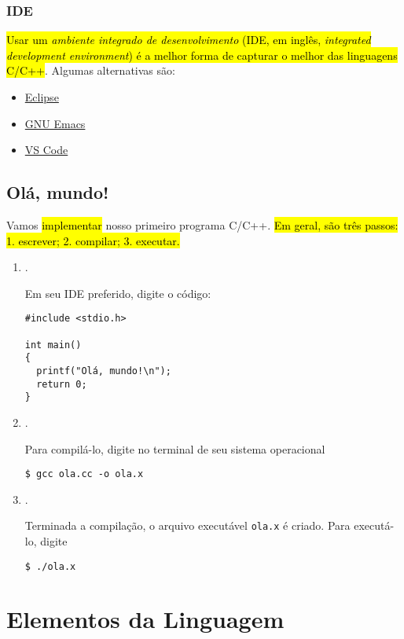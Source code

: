 \documentclass[12pt]{article}
\begin{document}
\subsubsection{IDE}

\hl{Usar um \emph{ambiente integrado de desenvolvimento} (IDE, em inglês, \textit{integrated development environment}) é a melhor forma de capturar o melhor das linguagens C/C++}. Algumas alternativas são:
\begin{itemize}
\item \href{https://www.eclipse.org/ide/}{Eclipse}
\item \href{https://www.gnu.org/software/emacs/download.html}{GNU Emacs}
\item \href{https://code.visualstudio.com/}{VS Code}
\end{itemize}

\subsection{Olá, mundo!}

Vamos \hl{implementar} nosso primeiro programa C/C++. \hl{Em geral, são três passos: 1. escrever; 2. compilar; 3. executar.}

\begin{enumerate}[1.]
\item {}.

  Em seu IDE preferido, digite o código:
\begin{lstlisting}[caption=ola.cc]
#include <stdio.h>

int main()
{
  printf("Olá, mundo!\n");
  return 0;
}
\end{lstlisting}
  
\item {}.

Para compilá-lo, digite no terminal de seu sistema operacional
\begin{lstlisting}
$ gcc ola.cc -o ola.x
\end{lstlisting}

\item {}.

Terminada a compilação, o arquivo executável \lstinline+ola.x+ é criado. Para executá-lo, digite
\begin{lstlisting}
$ ./ola.x
\end{lstlisting}  
\end{enumerate}


\section{Elementos da Linguagem}\label{sec_elem}
\end{document}
